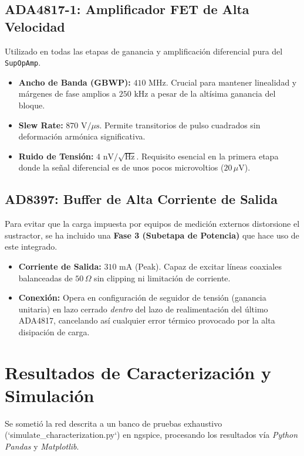 \documentclass[11pt, a4paper]{article}
\begin{document}
\subsection{ADA4817-1: Amplificador FET de Alta Velocidad}
Utilizado en todas las etapas de ganancia y amplificación diferencial pura del \texttt{SupOpAmp}.
\begin{itemize}
    \item \textbf{Ancho de Banda (GBWP):} $410\text{ MHz}$. Crucial para mantener linealidad y márgenes de fase amplios a $250\text{ kHz}$ a pesar de la altísima ganancia del bloque.
    \item \textbf{Slew Rate:} $870\text{ V/}\mu\text{s}$. Permite transitorios de pulso cuadrados sin deformación armónica significativa.
    \item \textbf{Ruido de Tensión:} $4\text{ nV/}\sqrt{\text{Hz}}$. Requisito esencial en la primera etapa donde la señal diferencial es de unos pocos microvoltios ($20\,\mu\text{V}$).
\end{itemize}

\subsection{AD8397: Buffer de Alta Corriente de Salida}
Para evitar que la carga impuesta por equipos de medición externos distorsione el sustractor, se ha incluido una \textbf{Fase 3 (Subetapa de Potencia)} que hace uso de este integrado.
\begin{itemize}
    \item \textbf{Corriente de Salida:} $310\text{ mA}$ (Peak). Capaz de excitar líneas coaxiales balanceadas de $50\,\Omega$ sin clipping ni limitación de corriente.
    \item \textbf{Conexión:} Opera en configuración de seguidor de tensión (ganancia unitaria) en lazo cerrado \textit{dentro} del lazo de realimentación del último ADA4817, cancelando así cualquier error térmico provocado por la alta disipación de carga.
\end{itemize}

\newpage
\section{Resultados de Caracterización y Simulación}

Se sometió la red descrita a un banco de pruebas exhaustivo (`simulate\_characterization.py`) en ngspice, procesando los resultados vía \textit{Python Pandas} y \textit{Matplotlib}.
\end{document}
